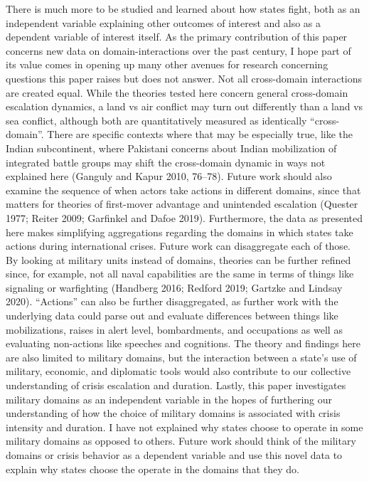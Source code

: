 \documentclass[
]{article}
\begin{document}
There is much more to be studied and learned about how states fight, both as an independent variable explaining other outcomes of interest and also as a dependent variable of interest itself. As the primary contribution of this paper concerns new data on domain-interactions over the past century, I hope part of its value comes in opening up many other avenues for research concerning questions this paper raises but does not answer. Not all cross-domain interactions are created equal. While the theories tested here concern general cross-domain escalation dynamics, a land vs air conflict may turn out differently than a land vs sea conflict, although both are quantitatively measured as identically ``cross-domain''. There are specific contexts where that may be especially true, like the Indian subcontinent, where Pakistani concerns about Indian mobilization of integrated battle groups may shift the cross-domain dynamic in ways not explained here (Ganguly and Kapur 2010, 76--78). Future work should also examine the sequence of when actors take actions in different domains, since that matters for theories of first-mover advantage and unintended escalation (Quester 1977; Reiter 2009; Garfinkel and Dafoe 2019). Furthermore, the data as presented here makes simplifying aggregations regarding the domains in which states take actions during international crises. Future work can disaggregate each of those. By looking at military units instead of domains, theories can be further refined since, for example, not all naval capabilities are the same in terms of things like signaling or warfighting (Handberg 2016; Redford 2019; Gartzke and Lindsay 2020). ``Actions'' can also be further disaggregated, as further work with the underlying data could parse out and evaluate differences between things like mobilizations, raises in alert level, bombardments, and occupations as well as evaluating non-actions like speeches and cognitions. The theory and findings here are also limited to military domains, but the interaction between a state's use of military, economic, and diplomatic tools would also contribute to our collective understanding of crisis escalation and duration. Lastly, this paper investigates military domains as an independent variable in the hopes of furthering our understanding of how the choice of military domains is associated with crisis intensity and duration. I have not explained why states choose to operate in some military domains as opposed to others. Future work should think of the military domains or crisis behavior as a dependent variable and use this novel data to explain why states choose the operate in the domains that they do.
\end{document}
